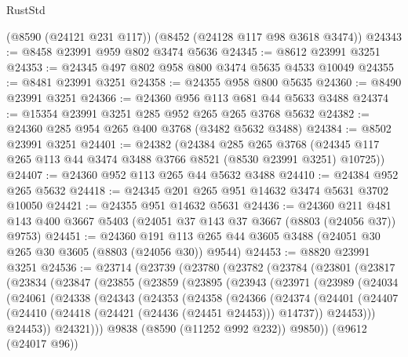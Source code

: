 \begin{lexlean}{RustStd}
\begin{coremodule}
    (@8590 (@24121 @231 @117))
    (@8452 (@24128 @117 @98 @3618 @3474))
@24343 := @8458 @23991 @959 @802 @3474 @5636
@24345 := @8612 @23991 @3251
@24353 := @24345 @497 @802 @958 @800 @3474 @5635 @4533 @10049
@24355 := @8481 @23991 @3251
@24358 := @24355 @958 @800 @5635
@24360 := @8490 @23991 @3251
@24366 := @24360 @956 @113 @681 @44 @5633 @3488
@24374 := @15354 @23991 @3251 @285 @952 @265 @265 @3768 @5632
@24382 := @24360 @285 @954 @265 @400 @3768 (@3482 @5632 @3488)
@24384 := @8502 @23991 @3251
@24401 := @24382
    (@24384
      @285
      @265
      @3768
      (@24345 @117 @265 @113 @44 @3474 @3488 @3766 @8521 (@8530 @23991 @3251) @10725))
@24407 := @24360 @952 @113 @265 @44 @5632 @3488
@24410 := @24384 @952 @265 @5632
@24418 := @24345 @201 @265 @951 @14632 @3474 @5631 @3702 @10050
@24421 := @24355 @951 @14632 @5631
@24436 := @24360
    @211
    @481
    @143
    @400
    @3667
    @5403
    (@24051 @37 @143 @37 @3667 (@8803 (@24056 @37)) @9753)
@24451 := @24360
    @191
    @113
    @265
    @44
    @3605
    @3488
    (@24051 @30 @265 @30 @3605 (@8803 (@24056 @30)) @9544)
@24453 := @8820 @23991 @3251
@24536 := @23714
    (@23739
      (@23780
        (@23782
          (@23784
            (@23801
              (@23817
                (@23834
                  (@23847
                    (@23855
                      (@23859
                        (@23895
                          (@23943
                            (@23971
                              (@23989
                                (@24034
                                  (@24061
                                    (@24338
                                      (@24343
                                        (@24353
                                          (@24358
                                            (@24366
                                              (@24374
                                                (@24401
                                                  (@24407
                                                    (@24410
                                                      (@24418
                                                        (@24421 (@24436 (@24451 @24453)))
                                                        @14737))
                                                    @24453)))
                                              @24453))
                                          @24321)))
                                    @9838
                                    (@8590 (@11252 @992 @232))
                                    @9850))
                                (@9612 (@24017 @96))

\end{coremodule}
\end{lexlean}

